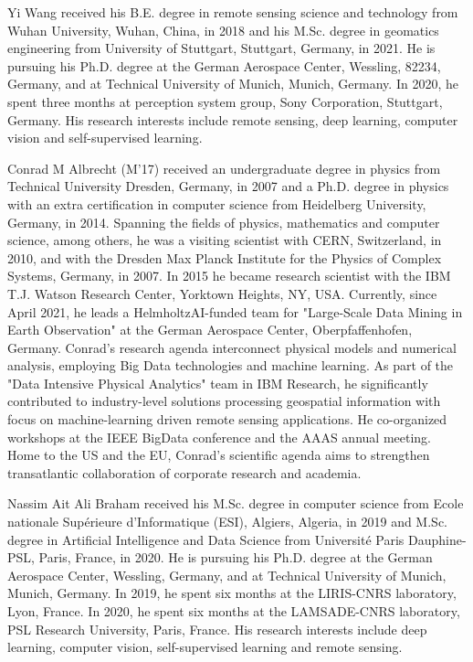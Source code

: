 \documentclass[lettersize,journal]{IEEEtran}
\begin{document}
\small{
\printbibliography
}





\begin{IEEEbiographynophoto}{Yi Wang} received his B.E. degree in remote sensing science and technology from Wuhan University, Wuhan, China, in 2018 and his M.Sc. degree in geomatics engineering from University of Stuttgart, Stuttgart, Germany, in 2021. He is pursuing his Ph.D. degree at the German Aerospace Center, Wessling, 82234, Germany, and at Technical University of Munich, Munich, Germany. In 2020, he spent three months at perception system group, Sony Corporation, Stuttgart, Germany. His research interests include remote sensing, deep learning, computer vision and self-supervised learning. 
\end{IEEEbiographynophoto}


\begin{IEEEbiographynophoto}{Conrad M Albrecht} (M'17) received an undergraduate degree in physics from Technical University Dresden, Germany, in 2007 and a Ph.D. degree in physics with an extra certification in computer science from Heidelberg University, Germany, in 2014. Spanning the fields of physics, mathematics and computer science, among others, he was a visiting scientist with CERN, Switzerland, in 2010, and with the Dresden Max Planck Institute for the Physics of Complex Systems, Germany, in 2007. In 2015 he became research scientist with the IBM T.J. Watson Research Center, Yorktown Heights, NY, USA. Currently, since April 2021, he leads a HelmholtzAI-funded team for "Large-Scale Data Mining in Earth Observation" at the German Aerospace Center, Oberpfaffenhofen, Germany. Conrad's research agenda interconnect physical models and numerical analysis, employing Big Data technologies and machine learning. As part of the "Data Intensive Physical Analytics" team in IBM Research, he significantly contributed to industry-level solutions processing geospatial information with focus on machine-learning driven remote sensing applications. He co-organized workshops at the IEEE BigData conference and the AAAS annual meeting. Home to the US and the EU, Conrad's scientific agenda aims to strengthen transatlantic collaboration of corporate research and academia.

\end{IEEEbiographynophoto}


\begin{IEEEbiographynophoto}{Nassim Ait Ali Braham} received his M.Sc. degree in computer science from Ecole nationale Supérieure d'Informatique (ESI), Algiers, Algeria, in 2019 and M.Sc. degree in Artificial Intelligence and Data Science from Université Paris Dauphine-PSL, Paris, France, in 2020. He is pursuing his Ph.D. degree at the German Aerospace Center, Wessling, Germany, and at Technical University of Munich, Munich, Germany. In 2019, he spent six months at the LIRIS-CNRS laboratory, Lyon, France. In 2020, he spent six months at the LAMSADE-CNRS laboratory, PSL Research University, Paris, France. His research interests include deep learning, computer vision, self-supervised learning and remote sensing.
\end{IEEEbiographynophoto}
\end{document}
